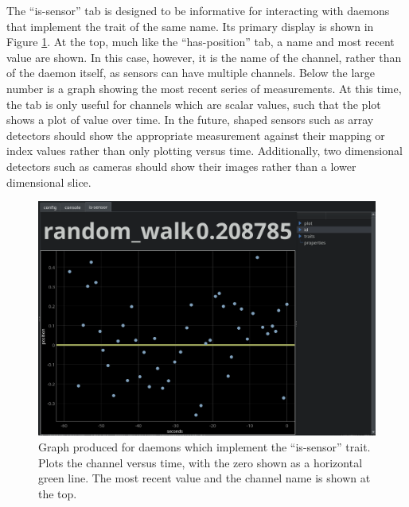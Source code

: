 The ``is-sensor'' tab is designed to be informative for interacting with daemons that implement the trait of the same name.
Its primary display is shown in Figure \ref{yaq:fig:is_sensor_graph}.
At the top, much like the ``has-position'' tab, a name and most recent value are shown.
In this case, however, it is the name of the channel, rather than of the daemon itself, as sensors can have multiple channels.
Below the large number is a graph showing the most recent series of measurements.
At this time, the tab is only useful for channels which are scalar values, such that the plot shows a plot of value over time.
In the future, shaped sensors such as array detectors should show the appropriate measurement against their mapping or index values rather than only plotting versus time.
Additionally, two dimensional detectors such as cameras should show their images rather than a lower dimensional slice.


\begin{landscape}
\begin{figure}
\includegraphics[width=8in]{"yaq/images/is_sensor_graph"}
\caption[\yaqcqtpy{} is-sensor Graph]{
	Graph produced for daemons which implement the 	``is-sensor'' trait.
	Plots the channel versus time, with the zero shown as a horizontal green line.
	The most recent value and the channel name is shown at the top.
}
\label{yaq:fig:is_sensor_graph}
\end{figure}
\end{landscape}

